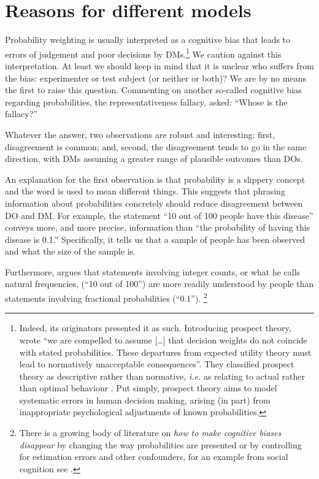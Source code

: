 \documentclass[a4paper, 12pt]{article}
\newcommand{\seclabel}[1]{\label{sec:#1}}
\newcommand{\ie}{\textit{i.e.}\xspace}
\begin{document}
\section{Reasons for different models\seclabel{Reasons_for}}
Probability weighting is usually interpreted as a cognitive bias that leads to errors of judgement and poor decisions by DMs.\footnote{Indeed, its originators presented it as such.
Introducing prospect theory, \textcite[277]{KahnemanTversky1979} wrote ``we are compelled to assume [\dots] that decision weights do not coincide with stated probabilities. These departures from expected utility theory must lead to normatively unacceptable consequences''.
They classified prospect theory as descriptive rather than normative, \ie as relating to actual rather than optimal behaviour \parencite[p. S252]{TverskyKahneman1986}.
Put simply, prospect theory aims to model systematic errors in human decision making, arising (in part) from inappropriate psychological adjustments of known probabilities.}
We caution against this interpretation.
At least we should keep in mind that it is unclear who suffers from the bias: experimenter or test subject (or neither or both)?
We are by no means the first to raise this question.
Commenting on another so-called cognitive bias regarding probabilities, the representativeness fallacy, \textcite{Cohen1979a} asked: ``Whose is the fallacy?''

Whatever the answer, two observations are robust and interesting: first, disagreement is common; and, second, the disagreement tends to go in the same direction, with DMs assuming a greater range of plausible outcomes than DOs.

An explanation for the first observation is that probability is a slippery concept and the word is used to mean different things. This suggests that phrasing information about probabilities concretely should reduce disagreement between DO and DM. For example, the statement ``10 out of 100 people have this disease'' conveys more, and more precise, information than ``the probability of having this disease is 0.1.'' Specifically, it tells us that a sample of people has been observed and what the size of the sample is.

Furthermore, \textcite{Gigerenzer2018} argues that statements involving integer counts, or what he calls natural frequencies,  (``10 out of 100'') are more readily understood by people than statements involving fractional probabilities (``0.1'').%
\footnote{There is a growing body of literature on \textit{how to make cognitive biases disappear} by changing the way probabilities are presented \parencite{Gigerenzer1991} or by controlling for estimation errors and other confounders, for an example from social cognition see \textcite{GalesicETAL2012}.}
\end{document}

